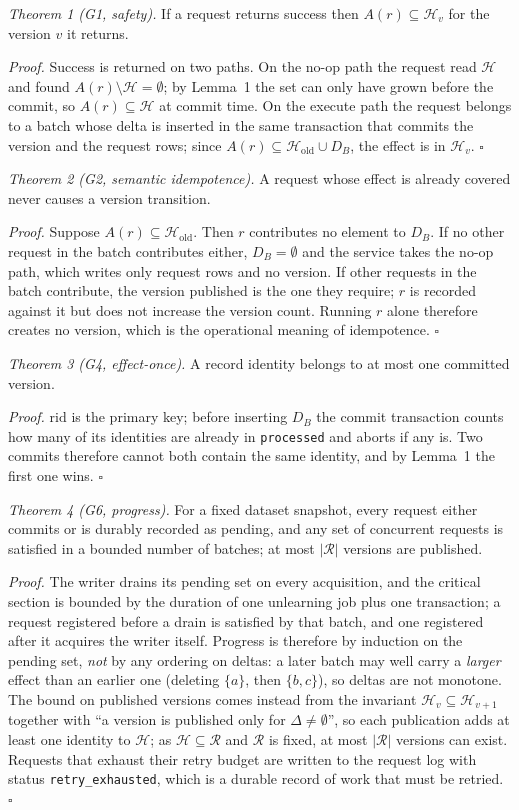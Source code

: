 \documentclass[conference]{IEEEtran}
\newcommand{\Hset}{\mathcal{H}}
\newcommand{\Rset}{\mathcal{R}}
\begin{document}
\emph{Theorem 1 (G1, safety).} If a request returns success then
$A(r)\subseteq\Hset_{v}$ for the version $v$ it returns.

\emph{Proof.} Success is returned on two paths.  On the no-op path the request read
$\Hset$ and found $A(r)\setminus\Hset=\emptyset$; by Lemma~1 the set can only have
grown before the commit, so $A(r)\subseteq\Hset$ at commit time.  On the execute path
the request belongs to a batch whose delta is inserted in the same transaction that
commits the version and the request rows; since $A(r)\subseteq\Hset_{\text{old}}\cup
D_B$, the effect is in $\Hset_v$. \hfill$\square$

\emph{Theorem 2 (G2, semantic idempotence).} A request whose effect is already
covered never causes a version transition.

\emph{Proof.} Suppose $A(r)\subseteq\Hset_{\text{old}}$.  Then $r$ contributes no
element to $D_B$.  If no other request in the batch contributes either, $D_B=\emptyset$
and the service takes the no-op path, which writes only request rows and no version.
If other requests in the batch contribute, the version published is the one they
require; $r$ is recorded against it but does not increase the version count.  Running
$r$ alone therefore creates no version, which is the operational meaning of
idempotence. \hfill$\square$

\emph{Theorem 3 (G4, effect-once).} A record identity belongs to at most one
committed version.

\emph{Proof.} $\mathrm{rid}$ is the primary key; before inserting $D_B$ the commit
transaction counts how many of its identities are already in \texttt{processed} and
aborts if any is.  Two commits therefore cannot both contain the same identity, and
by Lemma~1 the first one wins. \hfill$\square$

\emph{Theorem 4 (G6, progress).} For a fixed dataset snapshot, every request either
commits or is durably recorded as pending, and any set of concurrent requests is
satisfied in a bounded number of batches; at most $|\Rset|$ versions are published.

\emph{Proof.} The writer drains its pending set on every acquisition, and the critical
section is bounded by the duration of one unlearning job plus one transaction; a
request registered before a drain is satisfied by that batch, and one registered after
it acquires the writer itself.  Progress is therefore by induction on the pending set,
\emph{not} by any ordering on deltas: a later batch may well carry a \emph{larger}
effect than an earlier one (deleting $\{a\}$, then $\{b,c\}$), so deltas are not
monotone.  The bound on published versions comes instead from the invariant
$\Hset_v\subseteq\Hset_{v+1}$ together with ``a version is published only for
$\Delta\neq\emptyset$'', so each publication adds at least one identity to $\Hset$; as
$\Hset\subseteq\Rset$ and $\Rset$ is fixed, at most $|\Rset|$ versions can exist.
Requests that exhaust their retry budget are written to the request log with status
\texttt{retry\_exhausted}, which is a durable record of work that must be retried.
\hfill$\square$
\end{document}
